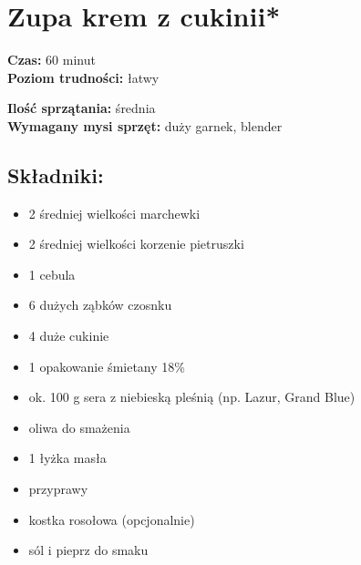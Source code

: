 \documentclass[a4paper,10pt]{book}
\begin{document}
\chapter{Zupa krem z cukinii*}

\vspace{0.1cm}
\small
\begin{minipage}{0.45\textwidth}
    \noindent \textbf{Czas:} 60 minut \\
    \textbf{Poziom trudności:} łatwy
\end{minipage}
\begin{minipage}{0.45\textwidth}
    \noindent \textbf{Ilość sprzątania:} średnia\\
    \textbf{Wymagany mysi sprzęt:} duży garnek, blender
\end{minipage}
\normalsize
\vspace{0.5cm}

\begin{multicols}{2}

\section*{Składniki:}
\begin{itemize}
    \item 2 średniej wielkości marchewki
    \item 2 średniej wielkości korzenie pietruszki
    \item 1 cebula
    \item 6 dużych ząbków czosnku
    \item 4 duże cukinie
    \item 1 opakowanie śmietany 18\%
    \item ok. 100 g sera z niebieską pleśnią (np. Lazur, Grand Blue)
    \item oliwa do smażenia
    \item 1 łyżka masła
    \item przyprawy
    \item kostka rosołowa (opcjonalnie)
    \item sól i pieprz do smaku
\end{itemize}

\columnbreak

\begin{figure}[H]
    \centering
\end{figure}
\end{multicols}
\end{document}
